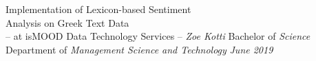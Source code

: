\documentclass[dvips,letterpaper,12pt]{report}
\begin{document}
\sloppy


\thesistitle
	{Implementation of Lexicon-based Sentiment \\
	\vspace{3mm}
	 Analysis on Greek Text Data \\
	\vspace{1cm}
	 -- at isMOOD Data Technology Services --}
	{\emph{Zoe Kotti}}
	{Bachelor of \emph{Science}}
	{Department of \emph{Management Science and Technology}}
	{\emph{June 2019}}
















\appendix

\end{document}
